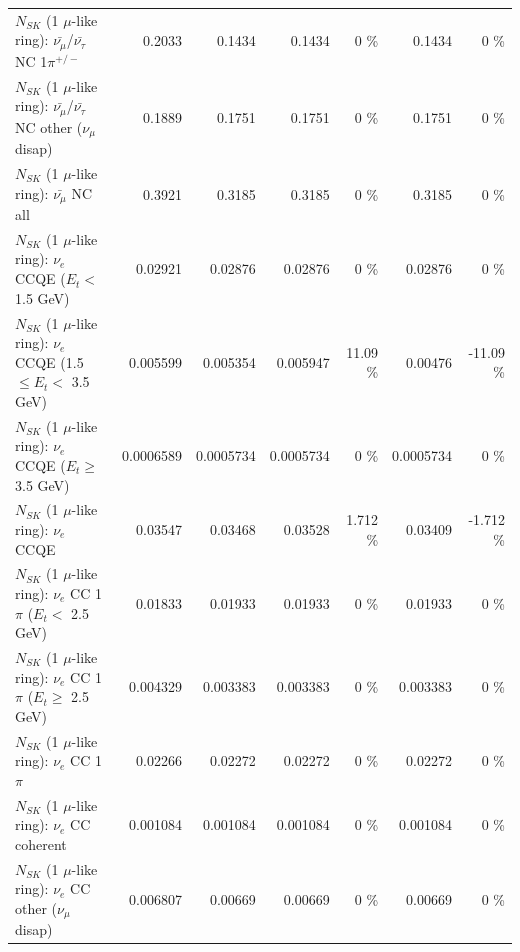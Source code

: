 \begin{table}
\begin{tabular}{| l | r | r | r  r | r  r |}
\hline
  $N_{SK}$ (1 $\mu$-like ring): $\bar{\nu_\mu}$/$\bar{\nu_\tau}$ NC 1$\pi^{+/-}$ &          0.2033 &          0.1434 &          0.1434 &        0 \%  &          0.1434 &        0 \%  \\ 
$N_{SK}$ (1 $\mu$-like ring): $\bar{\nu_\mu}$/$\bar{\nu_\tau}$ NC other ($\nu_\mu$ disap) &          0.1889 &          0.1751 &          0.1751 &        0 \%  &          0.1751 &        0 \%  \\ 
                          $N_{SK}$ (1 $\mu$-like ring): $\bar{\nu_{\mu}}$ NC all &          0.3921 &          0.3185 &          0.3185 &        0 \%  &          0.3185 &        0 \%  \\ 
\hline
\hline
\hline
                  $N_{SK}$ (1 $\mu$-like ring): $\nu_e$ CCQE ($E_{t} <$ 1.5 GeV) &         0.02921 &         0.02876 &         0.02876 &        0 \%  &         0.02876 &        0 \%  \\ 
         $N_{SK}$ (1 $\mu$-like ring): $\nu_e$ CCQE (1.5 $\leq E_{t} <$ 3.5 GeV) &        0.005599 &        0.005354 &        0.005947 &    11.09 \%  &         0.00476 &   -11.09 \%  \\ 
               $N_{SK}$ (1 $\mu$-like ring): $\nu_e$ CCQE ($E_{t} \geq$ 3.5 GeV) &       0.0006589 &       0.0005734 &       0.0005734 &        0 \%  &       0.0005734 &        0 \%  \\ 
\hline
                                      $N_{SK}$ (1 $\mu$-like ring): $\nu_e$ CCQE &         0.03547 &         0.03468 &         0.03528 &    1.712 \%  &         0.03409 &   -1.712 \%  \\ 
\hline
             $N_{SK}$ (1 $\mu$-like ring): $\nu_e$ CC 1$\pi$ ($E_{t} <$ 2.5 GeV) &         0.01833 &         0.01933 &         0.01933 &        0 \%  &         0.01933 &        0 \%  \\ 
          $N_{SK}$ (1 $\mu$-like ring): $\nu_e$ CC 1$\pi$ ($E_{t} \geq$ 2.5 GeV) &        0.004329 &        0.003383 &        0.003383 &        0 \%  &        0.003383 &        0 \%  \\ 
\hline
                                 $N_{SK}$ (1 $\mu$-like ring): $\nu_e$ CC 1$\pi$ &         0.02266 &         0.02272 &         0.02272 &        0 \%  &         0.02272 &        0 \%  \\ 
                               $N_{SK}$ (1 $\mu$-like ring): $\nu_e$ CC coherent &        0.001084 &        0.001084 &        0.001084 &        0 \%  &        0.001084 &        0 \%  \\ 
                $N_{SK}$ (1 $\mu$-like ring): $\nu_e$ CC other ($\nu_\mu$ disap) &        0.006807 &         0.00669 &         0.00669 &        0 \%  &         0.00669 &        0 \%  \\ 

\end{tabular}
\end{table}
